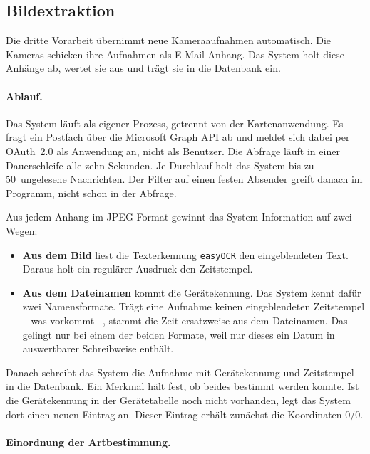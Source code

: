 \documentclass[12pt,a4paper]{report}
\begin{document}
\subsection{Bildextraktion}
\label{subsec:bildextraktion}

Die dritte Vorarbeit \cite{LelchatBA} übernimmt neue Kameraaufnahmen automatisch. Die
Kameras schicken ihre Aufnahmen als E-Mail-Anhang. Das System holt diese Anhänge ab, wertet
sie aus und trägt sie in die Datenbank ein.

\paragraph{Ablauf.}

Das System läuft als eigener Prozess, getrennt von der Kartenanwendung. Es fragt ein
Postfach über die Microsoft Graph API ab und meldet sich dabei per OAuth~2.0 als Anwendung
an, nicht als Benutzer. Die Abfrage läuft in einer Dauerschleife alle zehn Sekunden. Je
Durchlauf holt das System bis zu 50~ungelesene Nachrichten. Der Filter auf einen festen
Absender greift danach im Programm, nicht schon in der Abfrage.

Aus jedem Anhang im JPEG-Format gewinnt das System Information auf zwei Wegen:

\begin{itemize}
    \item \textbf{Aus dem Bild} liest die Texterkennung \texttt{easyOCR} den eingeblendeten
    Text. Daraus holt ein regulärer Ausdruck den Zeitstempel.
    \item \textbf{Aus dem Dateinamen} kommt die Gerätekennung. Das System kennt dafür zwei
    Namensformate. Trägt eine Aufnahme keinen eingeblendeten Zeitstempel -- was vorkommt
    \cite[S.~25]{LelchatBA} --, stammt die Zeit ersatzweise aus dem Dateinamen. Das gelingt
    nur bei einem der beiden Formate, weil nur dieses ein Datum in auswertbarer
    Schreibweise enthält.
\end{itemize}

Danach schreibt das System die Aufnahme mit Gerätekennung und Zeitstempel in die Datenbank.
Ein Merkmal hält fest, ob beides bestimmt werden konnte. Ist die Gerätekennung in der
Gerätetabelle noch nicht vorhanden, legt das System dort einen neuen Eintrag an. Dieser
Eintrag erhält zunächst die Koordinaten 0/0.

\paragraph{Einordnung der Artbestimmung.}
\end{document}
